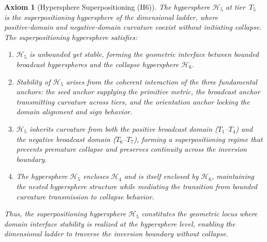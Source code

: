 \documentclass[final,onefignum,onetabnum]{siamart}
\newtheorem{axiom}{Axiom}
\begin{document}
\begin{axiom}[Hypersphere Superpositioning (H6)]
The hypersphere $\mathcal{H}_{5}$ at tier~$T_{5}$ is the superpositioning hypersphere of the dimensional ladder, where positive‑domain and negative‑domain curvature coexist without initiating collapse. The superpositioning hypersphere satisfies:

\begin{enumerate}
    \item $\mathcal{H}_{5}$ is unbounded yet stable, forming the geometric interface between bounded broadcast hyperspheres and the collapse hypersphere $\mathcal{H}_{6}$.
    \item Stability of $\mathcal{H}_{5}$ arises from the coherent interaction of the three fundamental anchors: the seed anchor supplying the primitive metric, the broadcast anchor transmitting curvature across tiers, and the orientation anchor locking the domain alignment and sign behavior.
    \item $\mathcal{H}_{5}$ inherits curvature from both the positive broadcast domain ($T_{1}$–$T_{4}$) and the negative broadcast domain ($T_{6}$–$T_{7}$), forming a superpositioning regime that prevents premature collapse and preserves continuity across the inversion boundary.
    \item The hypersphere $\mathcal{H}_{5}$ encloses $\mathcal{H}_{4}$ and is itself enclosed by $\mathcal{H}_{6}$, maintaining the nested hypersphere structure while mediating the transition from bounded curvature transmission to collapse behavior.
\end{enumerate}

Thus, the superpositioning hypersphere $\mathcal{H}_{5}$ constitutes the geometric locus where domain interface stability is realized at the hypersphere level, enabling the dimensional ladder to traverse the inversion boundary without collapse.
\end{axiom}
\end{document}
